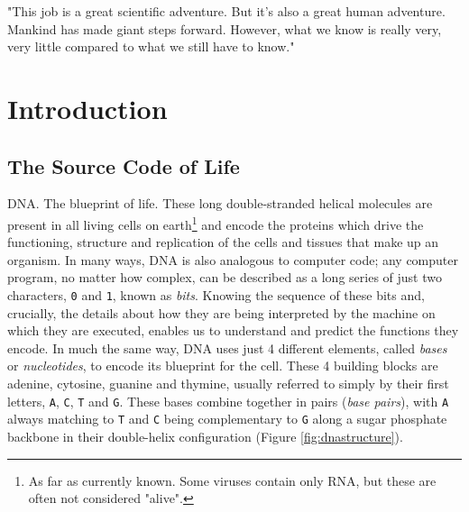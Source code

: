 \begin{savequote}[75mm]
"This job is a great scientific adventure. But it's also a great human adventure. Mankind has made giant steps forward. However, what we know is really very, very little compared to what we still have to know."
\end{savequote}



\chapter{Introduction}
\label{introduction}
\setcounter{figure}{-1}
\setcounter{table}{-1}
\setcounter{section}{-1}
\setcounter{NAT@ctr}{-1}

\setlength\parindent{0pt}

\begin{justify}

\section{The Source Code of Life}

DNA. The blueprint of life. These long double-stranded helical molecules are present in all living cells on earth\footnote{As far as currently known. Some viruses contain only RNA, but these are often not considered "alive".} and encode the proteins which drive the functioning, structure and replication of the cells and tissues that make up an organism. In many ways, DNA is also analogous to computer code; any computer program, no matter how complex, can be described as a long series of just two characters, \verb+0+ and \verb+1+, known as \emph{bits}. Knowing the sequence of these bits and, crucially, the details about how they are being interpreted by the machine on which they are executed, enables us to understand and predict the functions they encode. In much the same way, DNA uses just 4 different elements, called \emph{bases} or \emph{nucleotides}, to encode its blueprint for the cell. These 4 building blocks are adenine, cytosine, guanine and thymine, usually referred to simply by their first letters, \verb+A+, \verb+C+, \verb+T+ and \verb+G+. These bases combine together in pairs (\emph{base pairs}), with \verb+A+ always matching to \verb+T+ and \verb+C+ being complementary to \verb+G+ along a sugar phosphate backbone in their double-helix configuration (Figure \ref{fig:dnastructure}).

\end{justify}


